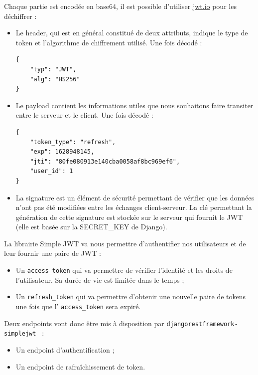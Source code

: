 Chaque partie est encodée en base64, il est possible d’utiliser \href{https://jwt.io}{jwt.io} pour les déchiffrer :
\begin{itemize}
\item Le {\color{monOrange}header}, qui est en général constitué de deux attributs, indique le type de token et l'algorithme de chiffrement utilisé.
Une fois décodé :
\begin{verbatim}
{
    "typ": "JWT",
    "alg": "HS256"
}
\end{verbatim}
\item Le {\color{monOrange}payload} contient les informations utiles que nous souhaitons faire transiter entre le serveur et le client.
Une fois décodé :
\begin{verbatim}
{
    "token_type": "refresh",
    "exp": 1628948145,
    "jti": "80fe080913e140cba0058af8bc969ef6",
    "user_id": 1
}
\end{verbatim}

\item La {\color{monOrange}signature} est un élément de sécurité permettant de vérifier que les données n’ont pas été modifiées entre les échanges client-serveur. La clé permettant la génération de cette signature est stockée sur le serveur qui fournit le JWT (elle est basée sur la SECRET\_KEY de Django).

\end{itemize}
La librairie Simple JWT va nous permettre d’authentifier nos utilisateurs et de leur fournir une paire de JWT :
\begin{itemize}
\item Un {\tt access\_token}  qui va permettre de vérifier l’identité et les droits de l’utilisateur. Sa durée de vie est limitée dans le temps ;
\item Un {\tt refresh\_token}  qui va permettre d’obtenir une nouvelle paire de tokens une fois que l’ {\tt access\_token}  sera expiré.
\end{itemize}
Deux endpoints vont donc être mis à disposition par {\tt djangorestframework-simplejwt } :
\begin{itemize}
\item Un endpoint d’authentification ;
\item Un endpoint de rafraîchissement de token.
\end{itemize}
